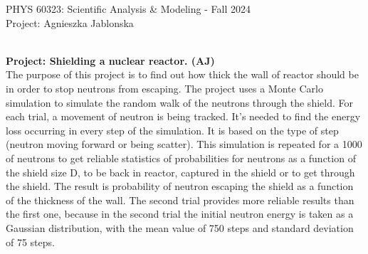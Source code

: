 \documentclass[12pt]{article}
\begin{document}
\def\pos{\medskip\quad}
\def\subpos{\smallskip \qquad}

\begin{center}
{\large
PHYS 60323: Scientific Analysis \& Modeling - Fall 2024
}\\
{\large Project: Agnieszka Jablonska}\\\vskip0.25in

\end{center}
 \\


\textbf{Project: Shielding a nuclear reactor. (AJ)}\\

The purpose of this project is to find out how thick the wall of reactor should be in order to stop neutrons from escaping.
The project uses a Monte Carlo simulation to simulate the random walk of the neutrons through the shield. For each trial, a movement of neutron is being tracked. It's needed to find the energy loss occurring in every step of the simulation. It is based on the type of step (neutron moving forward or being scatter). This simulation is repeated for a 1000 of neutrons to get reliable statistics of probabilities for neutrons as a function of the shield size D, to be back in reactor, captured in the shield or to get through the shield.  The result is probability of neutron escaping the shield as a function of the thickness of the wall. The second trial provides more reliable results than the first one, because in the second trial the initial neutron energy is taken as a Gaussian distribution, with the mean value of 750 steps and standard deviation of 75 steps. 

\vskip0.1in
 \\
\end{document}
